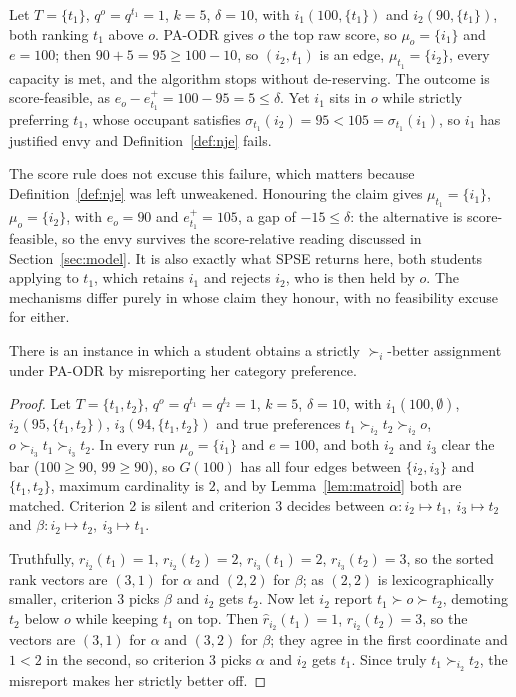 \documentclass[runningheads]{llncs}
\begin{document}
\begin{example}
\label{ex:paodr-envy}
Let $T=\{t_1\}$, $q^o=q^{t_1}=1$, $k=5$, $\delta=10$, with $i_1(100,\{t_1\})$ and $i_2(90,\{t_1\})$, both ranking $t_1$ above $o$. PA-ODR gives $o$ the top raw score, so $\mu_o=\{i_1\}$ and $e=100$; then $90+5=95\ge100-10$, so $(i_2,t_1)$ is an edge, $\mu_{t_1}=\{i_2\}$, every capacity is met, and the algorithm stops without de-reserving. The outcome is score-feasible, as $e_o-e_{t_1}^+=100-95=5\le\delta$. Yet $i_1$ sits in $o$ while strictly preferring $t_1$, whose occupant satisfies $\sigma_{t_1}(i_2)=95<105=\sigma_{t_1}(i_1)$, so $i_1$ has justified envy and Definition~\ref{def:nje} fails.

The score rule does not excuse this failure, which matters because Definition~\ref{def:nje} was left unweakened. Honouring the claim gives $\mu_{t_1}=\{i_1\}$, $\mu_o=\{i_2\}$, with $e_o=90$ and $e_{t_1}^+=105$, a gap of $-15\le\delta$: the alternative is score-feasible, so the envy survives the score-relative reading discussed in Section~\ref{sec:model}. It is also exactly what SPSE returns here, both students applying to $t_1$, which retains $i_1$ and rejects $i_2$, who is then held by $o$. The mechanisms differ purely in whose claim they honour, with no feasibility excuse for either.
\end{example}

\begin{proposition}
\label{prop:paodr-notsp}
There is an instance in which a student obtains a strictly $\succ_i$-better assignment under PA-ODR by misreporting her category preference.
\end{proposition}

\begin{proof}
Let $T=\{t_1,t_2\}$, $q^o=q^{t_1}=q^{t_2}=1$, $k=5$, $\delta=10$, with $i_1(100,\emptyset)$, $i_2(95,\{t_1,t_2\})$, $i_3(94,\{t_1,t_2\})$ and true preferences $t_1\succ_{i_2}t_2\succ_{i_2}o$, $o\succ_{i_3}t_1\succ_{i_3}t_2$. In every run $\mu_o=\{i_1\}$ and $e=100$, and both $i_2$ and $i_3$ clear the bar ($100\ge90$, $99\ge90$), so $G(100)$ has all four edges between $\{i_2,i_3\}$ and $\{t_1,t_2\}$, maximum cardinality is $2$, and by Lemma~\ref{lem:matroid} both are matched. Criterion 2 is silent and criterion 3 decides between $\alpha:i_2\mapsto t_1,\ i_3\mapsto t_2$ and $\beta:i_2\mapsto t_2,\ i_3\mapsto t_1$.

Truthfully, $r_{i_2}(t_1)=1$, $r_{i_2}(t_2)=2$, $r_{i_3}(t_1)=2$, $r_{i_3}(t_2)=3$, so the sorted rank vectors are $(3,1)$ for $\alpha$ and $(2,2)$ for $\beta$; as $(2,2)$ is lexicographically smaller, criterion 3 picks $\beta$ and $i_2$ gets $t_2$. Now let $i_2$ report $t_1\succ o\succ t_2$, demoting $t_2$ below $o$ while keeping $t_1$ on top. Then $\hat r_{i_2}(t_1)=1$, $\hat r_{i_2}(t_2)=3$, so the vectors are $(3,1)$ for $\alpha$ and $(3,2)$ for $\beta$; they agree in the first coordinate and $1<2$ in the second, so criterion 3 picks $\alpha$ and $i_2$ gets $t_1$. Since truly $t_1\succ_{i_2}t_2$, the misreport makes her strictly better off.
\end{proof}
\end{document}
